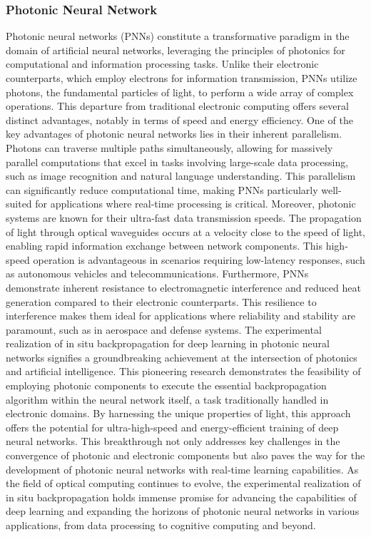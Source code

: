 \documentclass[nohyperref]{article}
\theoremstyle{plain}
\theoremstyle{definition}
\theoremstyle{remark}
\begin{document}
\subsubsection{Photonic Neural Network}
Photonic neural networks (PNNs) constitute a transformative paradigm in the domain of artificial neural networks, leveraging the principles of photonics for computational and information processing tasks. Unlike their electronic counterparts, which employ electrons for information transmission, PNNs utilize photons, the fundamental particles of light, to perform a wide array of complex operations. This departure from traditional electronic computing offers several distinct advantages, notably in terms of speed and energy efficiency.
One of the key advantages of photonic neural networks lies in their inherent parallelism. Photons can traverse multiple paths simultaneously, allowing for massively parallel computations that excel in tasks involving large-scale data processing, such as image recognition and natural language understanding. This parallelism can significantly reduce computational time, making PNNs particularly well-suited for applications where real-time processing is critical.
Moreover, photonic systems are known for their ultra-fast data transmission speeds. The propagation of light through optical waveguides occurs at a velocity close to the speed of light, enabling rapid information exchange between network components. This high-speed operation is advantageous in scenarios requiring low-latency responses, such as autonomous vehicles and telecommunications.
Furthermore, PNNs demonstrate inherent resistance to electromagnetic interference and reduced heat generation compared to their electronic counterparts. This resilience to interference makes them ideal for applications where reliability and stability are paramount, such as in aerospace and defense systems.
The experimental realization of in situ backpropagation for deep learning in photonic neural networks \cite{Pai_2023} signifies a groundbreaking achievement at the intersection of photonics and artificial intelligence. This pioneering research demonstrates the feasibility of employing photonic components to execute the essential backpropagation algorithm within the neural network itself, a task traditionally handled in electronic domains. By harnessing the unique properties of light, this approach offers the potential for ultra-high-speed and energy-efficient training of deep neural networks. This breakthrough not only addresses key challenges in the convergence of photonic and electronic components but also paves the way for the development of photonic neural networks with real-time learning capabilities. As the field of optical computing continues to evolve, the experimental realization of in situ backpropagation holds immense promise for advancing the capabilities of deep learning and expanding the horizons of photonic neural networks in various applications, from data processing to cognitive computing and beyond.
\end{document}
